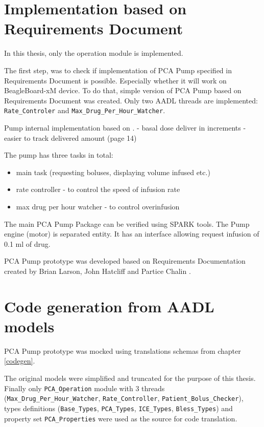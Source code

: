 \section{Implementation based on Requirements Document}

In this thesis, only the operation module is implemented.

The first step, was to check if implementation of PCA Pump specified in Requirements Document is possible. Especially whether it will work on BeagleBoard-xM device. To do that, simple version of PCA Pump based on Requirements Document was created. Only two AADL threads are implemented: \lstinline{Rate_Controler} and \lstinline{Max_Drug_Per_Hour_Watcher}.

Pump internal implementation based on \cite{CADD-PrizmAmbulatoryInfusionPump:Online}.
- basal dose deliver in increments - easier to track delivered amount (page 14)

The pump has three tasks in total:
\begin{itemize}
    \item main task (requesting boluses, displaying volume infused etc.)
    \item rate controller - to control the speed of infusion rate
    \item max drug per hour watcher - to control overinfusion
\end{itemize}

The main PCA Pump Package can be verified using SPARK tools. The Pump engine (motor) is separated entity. It has an interface allowing request infusion of 0.1 ml of drug.

PCA Pump prototype was developed based on Requirements Documentation created by Brian Larson, John Hatcliff and Partice Chalin \cite{PcaReq}.


\section{Code generation from AADL models}

PCA Pump prototype was mocked using translations schemas from chapter \ref{codegen}.

The original models were simplified and truncated for the purpose of this thesis. Finally only \lstinline{PCA_Operation} module with 3 threads (\lstinline{Max_Drug_Per_Hour_Watcher}, \lstinline{Rate_Controller}, \lstinline{Patient_Bolus_Checker}), types definitions (\lstinline{Base_Types}, \lstinline{PCA_Types}, \lstinline{ICE_Types}, \lstinline{Bless_Types}) and property set \lstinline{PCA_Properties} were used as the source for code translation.

